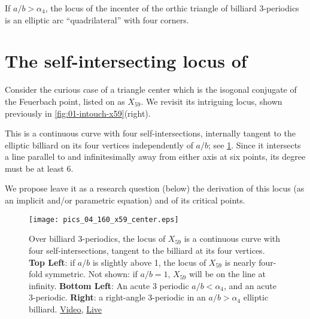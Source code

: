 \begin{corollary}
If $a/b>\alpha_4$, the locus of the incenter of the orthic triangle of billiard 3-periodics is an elliptic arc ``quadrilateral'' with four corners.
\end{corollary}


\section{The self-intersecting locus of }

Consider the curious case of a triangle center which is the isogonal conjugate of the Feuerbach point, listed on \cite{etc} as $X_{59}$. We revisit its intriguing locus, shown previously in \cref{fig:01-intouch-x59}(right).

This is a continuous curve with four self-intersections, internally tangent to the elliptic billiard on its four vertices independently of $a/b$; see \cref{fig:04-x59-locus}. Since it intersects a line parallel to and infinitesimally away from either axis at six points, its degree must be at least 6.

We propose leave it as a research question (below) the derivation of this locus (as an implicit and/or parametric equation) and of its critical points. 

\begin{figure}
    \centering
    \texttt{[image: pics\_04\_160\_x59\_center.eps]}
    \caption{Over billiard 3-periodics, the locus of $X_{59}$ is a continuous curve with four self-intersections, tangent to the billiard at its four vertices. \textbf{Top Left}: if $a/b$ is slightly above 1, the locus of  $X_{59}$ is nearly four-fold symmetric. Not shown: if $a/b=1$, $X_{59}$ will be on the line at infinity. \textbf{Bottom Left}: An acute 3 periodic $a/b<\alpha_4$, and an acute 3-periodic. \textbf{Right}: a right-angle 3-periodic in an $a/b>\alpha_4$ elliptic billiard. \href{https://youtu.be/pl_PqSuhlx0}{Video}, \href{https://bit.ly/3fvDlZd}{Live}}
    \label{fig:04-x59-locus}
\end{figure}




